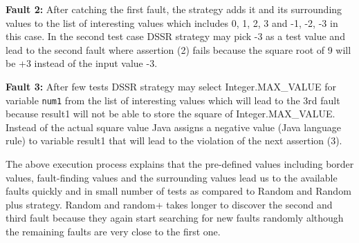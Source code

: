 \documentclass[conference]{IEEEtran}
\begin{document}
\indent \textbf{Fault 2:} After catching the first fault, the strategy adds it and its surrounding values to the list of interesting values which includes 0, 1, 2, 3 and -1, -2, -3 in this case. In the second test case DSSR strategy may pick -3 as a test value and lead to the second fault where assertion (2) fails because the square root of 9 will be +3 instead of the input value -3.

\indent \textbf{Fault 3:} After few tests DSSR strategy may select Integer.MAX\_VALUE for variable \verb+num1+  from the list of interesting values which will lead to the 3rd fault because result1 will not be able to store the square of Integer.MAX\_VALUE. Instead of the actual square value Java assigns a negative value (Java language rule) to variable result1 that will lead to the violation of the next assertion (3).

The above execution process explains that the pre-defined values including border values, fault-finding values and the surrounding values lead us to the available faults quickly and in small number of tests as compared to Random and Random plus strategy. Random and random+ takes longer to discover the second and third fault because they again start searching for new faults randomly although the remaining faults are very close to the first one. 



\end{document}
